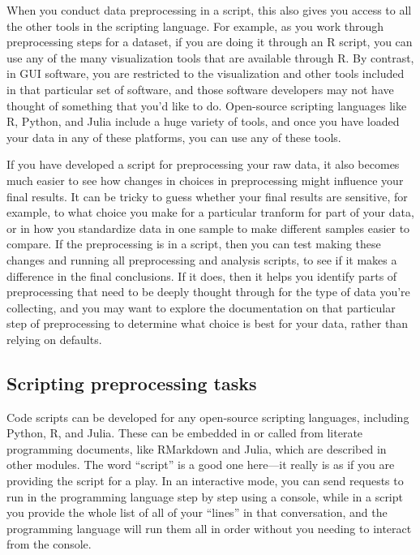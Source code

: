 \documentclass[]{tufte-book}
\begin{document}
When you conduct data preprocessing in a script, this also gives you access to
all the other tools in the scripting language. For example, as you work through
preprocessing steps for a dataset, if you are doing it through an R script, you
can use any of the many visualization tools that are available through R. By
contrast, in GUI software, you are restricted to the visualization and other
tools included in that particular set of software, and those software developers
may not have thought of something that you'd like to do. Open-source scripting
languages like R, Python, and Julia include a huge variety of tools, and once
you have loaded your data in any of these platforms, you can use any of these
tools.

If you have developed a script for preprocessing your raw data, it also becomes
much easier to see how changes in choices in preprocessing might influence your
final results. It can be tricky to guess whether your final results are sensitive,
for example, to what choice you make for a particular tranform for part of your
data, or in how you standardize data in one sample to make different samples
easier to compare. If the preprocessing is in a script, then you can test making
these changes and running all preprocessing and analysis scripts, to see if it
makes a difference in the final conclusions. If it does, then it helps you
identify parts of preprocessing that need to be deeply thought through for the
type of data you're collecting, and you may want to explore the documentation on
that particular step of preprocessing to determine what choice is best for your
data, rather than relying on defaults.

\hypertarget{scripting-preprocessing-tasks}{%
\subsection{Scripting preprocessing tasks}\label{scripting-preprocessing-tasks}}

Code scripts can be developed for any open-source scripting languages, including
Python, R, and Julia. These can be embedded in or called from literate programming
documents, like RMarkdown and Julia, which are described in other modules. The
word ``script'' is a good one here---it really is as if you are providing the script
for a play. In an interactive mode, you can send requests to run in the programming
language step by step using a console, while in a script you provide the whole list
of all of your ``lines'' in that conversation, and the programming language will run
them all in order without you needing to interact from the console.
\end{document}

